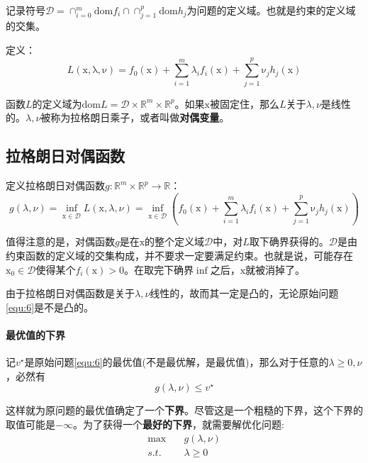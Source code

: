 \documentclass[a4paper]{D:/MyRepo/Script/latex/PaperReadingLog}
\begin{document}
记录符号$\mathcal{D}=\cap^m_{i=0}\mathrm{dom}f_i \cap \cap_{j=1}^p\mathrm{dom}h_j$为问题的定义域。也就是约束的定义域的交集。

定义：
$$
L(\mathrm{x},\mathrm{\lambda},\mathrm{\nu})=f_0(\mathrm{x})+\sum_{i=1}^m\lambda_if_i(\mathrm{x})+\sum_{j=1}^p\mathrm{\nu}_jh_j(\mathrm{x})
$$

函数$L$的定义域为$\mathrm{dom}L=\mathcal{D}\times\mathbb{R}^m\times\mathbb{R}^p$。如果$\mathrm{x}$被固定住，那么$L$关于$\lambda,\nu$是线性的。$\lambda,\nu$被称为拉格朗日乘子，或者叫做\textbf{对偶变量}。

\subsection{拉格朗日对偶函数}
定义拉格朗日对偶函数$g:\mathbb{R}^m\times\mathbb{R}^p\rightarrow \mathbb{R}$：
\begin{equation}
    \label{equ:7}
    g(\lambda,\nu)=\inf_{\mathrm{x}\in\mathcal{D}} L(\mathrm{x},\lambda,\nu)=\inf_{\mathrm{x}\in\mathcal{D}}(f_0(\mathrm{x})+\sum_{i=1}^m\lambda_if_i(\mathrm{x})+\sum_{j=1}^p\mathrm{\nu}_jh_j(\mathrm{x}))    
\end{equation}

值得注意的是，对偶函数$g$是在$\mathrm{x}$的整个定义域$\mathcal{D}$中，对$L$取下确界获得的。$\mathcal{D}$是由约束函数的定义域的交集构成，并不要求一定要满足约束。也就是说，可能存在$\mathrm{x}_0\in\mathcal{D}$使得某个$f_i(\mathrm{x})>0$。在取完下确界$\inf$之后，$\mathrm{x}$就被消掉了。

由于拉格朗日对偶函数是关于$\lambda,\nu$线性的，故而其一定是凸的，无论原始问题\ref{equ:6}是不是凸的。

\paragraph{最优值的下界}记$v^\star$是原始问题\ref{equ:6}的最优值(不是最优解，是最优值)，那么对于任意的$\lambda\ge0,\nu$，必然有
$$
g(\lambda,\nu)\le v^\star
$$

这样就为原问题的最优值确定了一个\textbf{下界}。尽管这是一个粗糙的下界，这个下界的取值可能是$-\infty$。为了获得一个\textbf{最好的下界}，就需要解优化问题:
\begin{equation}
    \label{equ:8}
    \begin{aligned}
        \max\quad&g(\lambda,\nu)\\
        s.t.\quad&\lambda\ge 0
    \end{aligned}        
\end{equation}
\end{document}
